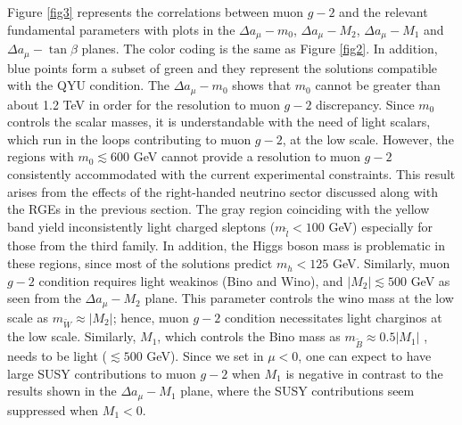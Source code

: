 \documentclass[12pt]{article}
\begin{document}
Figure \ref{fig3} represents the correlations between muon $g-2$ and the relevant fundamental parameters with plots in the $\Delta a_{\mu}-m_{0}$, $\Delta a_{\mu}-M_{2}$, $\Delta a_{\mu}-M_{1}$ and $\Delta a_{\mu}-\tan\beta$ planes. The color coding is the same as Figure \ref{fig2}. In addition, blue points form a subset of green and they represent the solutions compatible with the QYU condition. The $\Delta a_{\mu}-m_{0}$ shows that $m_{0}$ cannot be greater than about 1.2 TeV in order for the resolution to muon $g-2$ discrepancy. Since $m_{0}$ controls the scalar masses, it is understandable with the need of light scalars, which run in the loops contributing to muon $g-2$, at the low scale. However, the regions with $m_{0} \lesssim 600$ GeV cannot provide a resolution to muon $g-2$ consistently accommodated with the current experimental constraints. This result arises from the effects of the right-handed neutrino sector discussed along with the RGEs in the previous section. The gray region coinciding with the yellow band yield inconsistently light charged sleptons ($m_{\tilde{l}} < 100 $ GeV) especially for those from the third family. In addition, the Higgs boson mass is problematic in these regions, since most of the solutions predict $m_{h} < 125$ GeV. Similarly, muon $g-2$ condition requires light weakinos (Bino and Wino), and $|M_{2}| \lesssim 500$ GeV as seen from the $\Delta a_{\mu}-M_{2}$ plane. This parameter controls the wino mass at the low scale as $m_{\tilde{W}}\approx |M_{2}|$; hence, muon $g-2$ condition necessitates light charginos at the low scale. Similarly, $M_{1}$, which controls the Bino mass as $m_{\tilde{B}} \approx 0.5 |M_{1}|$ \cite{Gogoladze:2009bd}, needs to be light ($\lesssim 500$ GeV). Since we set in $\mu < 0$, one can expect to have large SUSY contributions to muon $g-2$ when $M_{1}$ is negative in contrast to the results shown in the $\Delta a_{\mu}-M_{1}$ plane, where the SUSY contributions seem suppressed when $M_{1} < 0$. 
\end{document}
